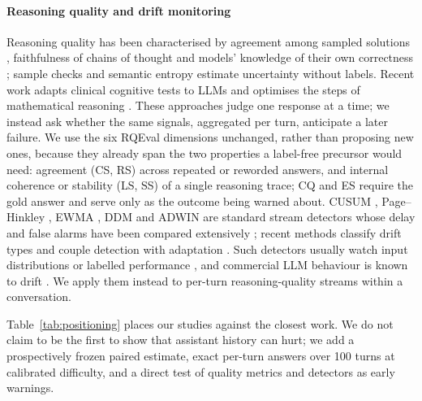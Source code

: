 \paragraph{Reasoning quality and drift monitoring}
Reasoning quality has been characterised by agreement among sampled solutions
\citep{wang2023selfconsistency}, faithfulness of chains of thought
\citep{wei2022chain,turpin2023say,lanham2023measuring} and models' knowledge of
their own correctness \citep{kadavath2022know}; sample checks
\citep{manakul2023selfcheckgpt} and semantic entropy
\citep{farquhar2024detecting} estimate uncertainty without labels. Recent work
adapts clinical cognitive tests to LLMs \citep{park2027lmmse} and optimises the
steps of mathematical reasoning \citep{lee2026fgrpo}. These approaches judge one
response at a time; we instead ask whether the same signals, aggregated per
turn, anticipate a later failure. We use the six RQEval dimensions
\citep{rqeval2026} unchanged, rather than proposing new ones, because they
already span the two properties a label-free precursor would need: agreement
(CS, RS) across repeated or reworded answers, and internal coherence or
stability (LS, SS) of a single reasoning trace; CQ and ES require the gold
answer and serve only as the outcome being warned about. CUSUM
\citep{page1954continuous}, Page--Hinkley
\citep{hinkley1971inference}, EWMA \citep{roberts1959control}, DDM
\citep{gama2004learning} and ADWIN \citep{bifet2007learning} are standard
stream detectors whose delay and false alarms have been compared extensively
\citep{gama2014survey,webb2016characterizing,goncalves2014comparative,barros2018largescale,bayram2022concept};
recent methods classify drift types \citep{deng2025zilean} and couple
detection with adaptation \citep{abushaira2027sccm}. Such detectors usually
watch input distributions or labelled performance
\citep{sculley2015hidden,rabanser2019failing}, and commercial LLM behaviour is
known to drift \citep{chen2024chatgpt}. We apply them instead to per-turn
reasoning-quality streams within a conversation.

Table~\ref{tab:positioning} places our studies against the closest work. We do
not claim to be the first to show that assistant history can hurt; we add a
prospectively frozen paired estimate, exact per-turn answers over 100 turns at
calibrated difficulty, and a direct test of quality metrics and detectors as
early warnings.

